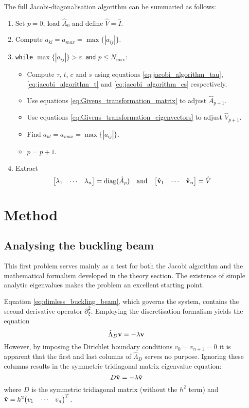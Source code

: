 \documentclass[reprint,english]{revtex4-1}
\begin{document}
The full Jacobi-diagonalisation algorithm can be summaried as follows:
\begin{enumerate}
\item Set \(p=0\), load \(\hat{A}_0\) and define \(\hat{V}=\hat{I}\).
\item Compute \(a_{kl}=a_{max}=\max\{|a_{ij}|\}\).
\item \texttt{while} \(\max\{|a_{ij}|\}>\varepsilon\,\) \texttt{and} \(p\leq N_{\text{max}}\):
	\begin{itemize}
	\item[]Compute \(\tau\), \(t\), \(c\) and \(s\) using equations \eqref{eq:jacobi_algorithm_tau}, \eqref{eq:jacobi_algorithm_t} and 	\eqref{eq:jacobi_algorithm_cs} respectively.
	\item[]Use equations \eqref{eq:Givens_transformation_matrix} to adjust \(\hat{A}_{p+1}\).
	\item[]Use equations \eqref{eq:Givens_transformation_eigenvectors} to adjust \(\hat{V}_{p+1}\).
	\item[]Find \(a_{kl}=a_{max}=\max\{|a_{ij}|\}\).
	\item[]\(p=p+1\).
	\end{itemize}
\item Extract
\[\mqty[\lambda_1&\cdots&\lambda_n]=\text{diag}(\hat{A}_p)\qand\mqty[\vu{v}_1&\cdots&\vu{v}_n]=\hat{V}\]
\end{enumerate}

\section{Method}
\subsection{Analysing the buckling beam}
This first problem serves mainly as a test for both the Jacobi algorithm and the mathematical formalism developed in the theory section. The existence of simple analytic eigenvalues makes the problem an excellent starting point.

Equation \eqref{eq:dimless_buckling_beam}, which governs the system, contains the second derivative operator \(\partial_\xi^2\). Employing the discretisation formalism yields the equation
\begin{equation}\label{eq:discrete_dimless_buckling_beam}
\hat{\Lambda}_D\vb{v}=-\lambda\vb{v}
\end{equation}
However, by imposing the Dirichlet boundary conditions \(v_0=v_{n+1}=0\) it is apparent that the first and last columns of \(\hat{\Lambda}_D\) serves no purpose. Ignoring these columns results in the symmetric tridiagonal matrix eigenvalue equation:
\begin{equation}\label{eq:method:buckling_beam}
D\tilde{\vb{v}}=-\lambda\tilde{\vb{v}}
\end{equation}
where \(D\) is the symmetric tridiagonal matrix (without the \(h^2\) term) and \(\tilde{\vb{v}}=h^2\mqty(v_1&\cdots&v_n)^T\).
\end{document}
